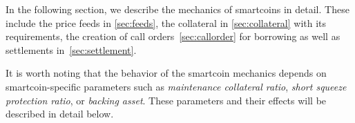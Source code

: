 In the following section, we describe the mechanics of smartcoins in
detail. These include the price feeds in \cref{sec:feeds}, the
collateral in \cref{sec:collateral} with its requirements, the creation
of call orders~\cref{sec:callorder} for borrowing as well as settlements
in~\cref{sec:settlement}.

It is worth noting that the behavior of the smartcoin mechanics depends
on smartcoin-specific parameters such as \emph{maintenance collateral ratio},
\emph{short squeeze protection ratio}, or \emph{backing asset}. These
parameters and their effects will be described in detail below.
